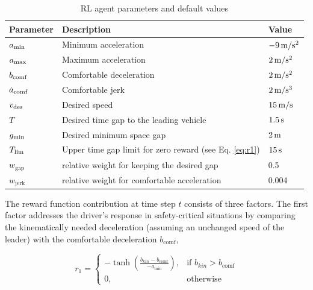 \documentclass[review]{elsarticle}
\providecommand{\sub}[1]{_{\mathrm{#1}}}  %
\providecommand{\3}{{\ss}}
\begin{document}
\begin{table}
	\caption{RL agent parameters and default values} 
	\label{tab:agentParameters} 
	\begin{center}
		\begin{tabular}{ p{}| p{}| p{}}
			Parameter & Description & Value \\ \hline
			$a\sub{\rm min}$ & Minimum acceleration & $\unit[-9]{m/s^2}$ \\  
			$a_{\rm max}$ & Maximum acceleration & $\unit[2]{m/s^2}$ \\  
			$b_{\rm comf}$ & Comfortable deceleration & $\unit[2]{m/s^2}$ \\  
			$\dot{a}_{\rm comf}$ & Comfortable jerk & $\unit[2]{m/s^3}$ \\  
			$v_{\rm des}$ & Desired speed & $\unit[15]{ m/s}$ \\  		
			$T$ & Desired time gap to the leading vehicle & $\unit[1.5]{s}$ \\
			$g_{\rm min}$ & Desired minimum space gap & $\unit[2]{m}$ \\
			$T_{\rm lim}$ & Upper time gap limit for zero reward (see
			Eq. \eqref{eq:r1}) & $\unit[15]{s}$ \\
			$w\sub{gap}$ & relative weight for keeping the desired gap & 0.5\\
			$w\sub{jerk}$ & relative weight for comfortable acceleration & 0.004\\
		\end{tabular}
	\end{center}
\end{table}



The reward function contribution at time step $t$ consists of three factors. 
The first factor addresses the driver's
response in safety-critical situations by comparing the
kinematically needed deceleration (assuming an
unchanged speed of the leader) with the
comfortable deceleration $b\sub{comf}$,



\begin{equation}
\label{r2}
r_1 = 
\begin{cases}
-\tanh\left(\frac{b_{kin}-b\sub{comf}}{-a\sub{min}}\right),& \text{if } b_{kin}>b\sub{comf}\\
0,              & \text{otherwise}
\end{cases}
\end{equation}
\end{document}
